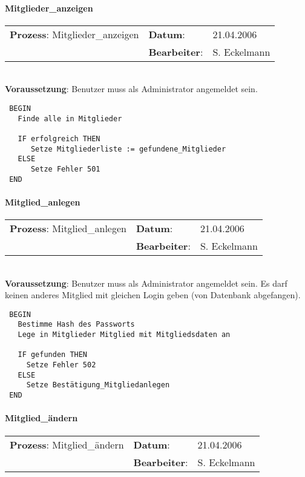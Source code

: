 \paragraph{Mitglieder\_anzeigen}
\begin{tabular}[t]{p{9.5cm}ll}
\textbf{Prozess}: Mitglieder\_anzeigen 	&\textbf{Datum}:      &21.04.2006\\
					&\textbf{Bearbeiter}: &S. Eckelmann\\
\end{tabular}

\hrulefill\\
\textbf{Voraussetzung}: Benutzer muss als Administrator angemeldet sein.
\begin{verbatim}
 BEGIN
   Finde alle in Mitglieder

   IF erfolgreich THEN
      Setze Mitgliederliste := gefundene_Mitglieder
   ELSE
      Setze Fehler 501
 END
\end{verbatim}
\hrulefill

\paragraph{Mitglied\_anlegen}
\begin{tabular}[t]{p{9.5cm}ll}
\textbf{Prozess}: Mitglied\_anlegen  	&\textbf{Datum}:      &21.04.2006\\
					&\textbf{Bearbeiter}: &S. Eckelmann\\
\end{tabular}

\hrulefill\\
\textbf{Voraussetzung}: Benutzer muss als Administrator angemeldet sein. Es darf keinen anderes Mitglied mit gleichen Login geben (von Datenbank abgefangen).
\begin{verbatim}
 BEGIN
   Bestimme Hash des Passworts
   Lege in Mitglieder Mitglied mit Mitgliedsdaten an

   IF gefunden THEN
     Setze Fehler 502
   ELSE
     Setze Bestätigung_Mitgliedanlegen
 END
\end{verbatim}
\hrulefill



\paragraph{Mitglied\_ändern}
\begin{tabular}[t]{p{9.5cm}ll}
\textbf{Prozess}: Mitglied\_ändern  	&\textbf{Datum}:      &21.04.2006\\
					&\textbf{Bearbeiter}: &S. Eckelmann\\
\end{tabular}


